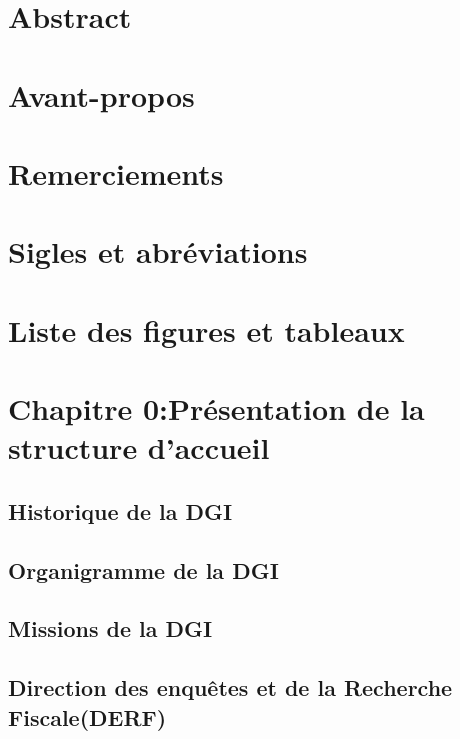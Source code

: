 \documentclass[a4paper,12pt]{report}
\begin{document}
\chapter*{Abstract}

\chapter*{Avant-propos}
\chapter*{Remerciements}

\chapter*{Sigles et abréviations}

\chapter*{Liste des figures et tableaux}


\chapter*{Chapitre 0:Présentation de la structure d'accueil}

\setcounter{section}{0}
\section{Historique de la DGI}
\section{Organigramme de la DGI}
\section{Missions de la DGI}
\section{Direction des enquêtes et de la Recherche Fiscale(DERF)}
\end{document}

